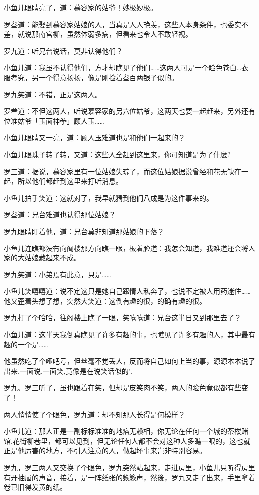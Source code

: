 \documentclass[12pt,oneside]{book}
\begin{document}
小鱼儿眼睛亮了，道：慕容家的姑爷！妙极妙极。

罗叁道：能娶到慕容家姑娘的人，当真是人人艳羡，这些人本身条件，也委实不差，就说那南宫柳，虽然体弱多病，但看来也令人不敢轻视。

罗九道：听兄台说话，莫非认得他们？

小鱼儿道：我虽不认得他们，方才却瞧见了他们\ldots\ldots 这两人可是一个睑色苍白\ldots 衣服考究，另一个得意扬扬，像是刚捡着叁百两银子似的。

罗九笑道：不错，正是这两人。

罗叁道：不但这两人，听说慕容家的另六位姑爷，这两天也要一起赶来，另外还有位准姑爷「玉面神拳」顾人玉\ldots\ldots{}

小鱼儿眼睛又一亮，道：顾人玉难道也是和他们一起来的？

小鱼儿眼珠子转了转，又道：这些人全赶到这里来，你可知道是为了什麽?

罗三道：据说，慕容家里有一位姑娘失琮了，而这位姑娘据说曾经和花无缺在一起，所以他们都赶到这里来打听消息。

小鱼儿拍手笑道：这就对了，我早就猜到他们八成是为这件事来的。

罗叁道：兄台难道也认得那位姑娘？

罗九眼睛盯着他，道：兄台莫非知道那姑娘的下落？

小鱼儿连瞧都没有向阁楼那方向瞧一眼，板着脸道：我怎会知道，我难道还会将人家的大姑娘藏起来不成。

罗九笑道：小弟焉有此意，只是\ldots\ldots{}

小鱼儿笑嘻嘻道：说不定这只是她自己跟情人私奔了，也说不定被人用药迷住\ldots\ldots 他又歪着头想了想，突然大笑道：这倒有趣的很，的确有趣的很。

罗九打了个哈哈，往阁楼上瞧了一眼，笑嘻嘻道：兄台这半日又到那里去了？

小鱼儿道：这半天我倒真瞧见了许多有趣的事，也瞧见了许多有趣的人，其中最有趣的一个是\ldots\ldots{}

他虽然吃了个哑吧亏，但丝毫不觉丢人，反而将自己如何上当的事，源源本本说了出来,一面说,一面笑,竟像是在说笑话似的".

罗九、罗三听了，虽也跟着在笑，但却是皮笑肉不笑，两人的睑色竟似都有些变了！

两人悄悄使了个眼色，罗九道：却不知那人长得是何模样？

小鱼儿道：那人正是一副标标准准的地痞无赖相，你无论在任何一个城的茶楼赌馆,花街柳巷里，都可以见到，但无论任何人都不会对这种人多瞧一眼的，这也就正是他厉害的地方，不引人注意的人，做起坏事来岂非特别容易。

罗九，罗三两人又交换了个眼色，罗九突然站起来，走进房里，小鱼儿只听得房里有开抽屉的声音，接着，是一阵纸张的簌簌声，然後，罗九又走了出来，手里拿着卷已旧得发黄的纸。
\end{document}
